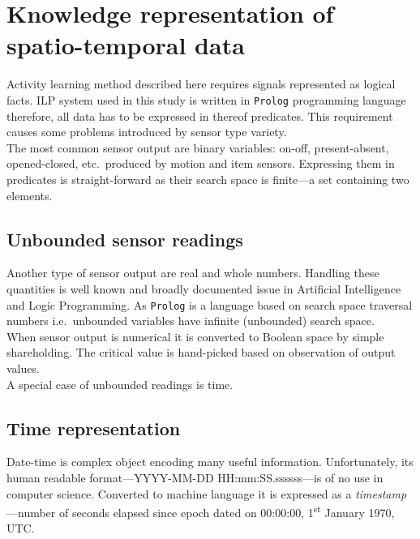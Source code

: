 \documentclass[12pt, a4paper, pdflatex, leqno, twoside, openright]{report}
\newcommand{\ts}{\textsuperscript}
\begin{document}
  \section{Knowledge representation of spatio-temporal data}
Activity learning method described here requires signals represented as logical facts. ILP system used in this study is written in \texttt{Prolog} programming language therefore, all data has to be expressed in thereof predicates. This requirement causes some problems introduced by sensor type variety.\\

The most common sensor output are binary variables: on-off, present-absent, opened-closed, etc.\ produced by motion and item sensors. Expressing them in predicates is straight-forward as their search space is finite---a set containing two elements.

    \subsection{Unbounded sensor readings}
Another type of sensor output are real and whole numbers. Handling these quantities is well known and broadly documented issue in Artificial Intelligence and Logic Programming. As \texttt{Prolog} is a language based on search space traversal numbers i.e.\ unbounded variables have infinite (unbounded) search space.\\

When sensor output is numerical it is converted to Boolean space by simple shareholding. The critical value is hand-picked based on observation of output values.\\
A special case of unbounded readings is time.

    \subsection{Time representation\label{sec:timeRepresentation}}
Date-time is complex object encoding many useful information. Unfortunately, its human readable format---YYYY-MM-DD HH:mm:SS.ssssss---is of no use in computer science. Converted to machine language it is expressed as a \emph{timestamp}---number of seconds elapsed since epoch dated on 00:00:00, 1\ts{st} January 1970, UTC.\\
\end{document}
